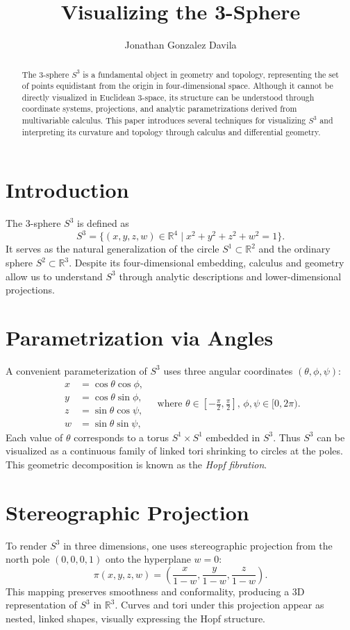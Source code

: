 \documentclass[12pt]{article}
\title{\textbf{Visualizing the 3-Sphere}}
\author{Jonathan Gonzalez Davila}
\date{} %
\begin{document}
\maketitle

\begin{abstract}
The 3-sphere \( S^3 \) is a fundamental object in geometry and topology, representing the set of points equidistant from the origin in four-dimensional space. Although it cannot be directly visualized in Euclidean 3-space, its structure can be understood through coordinate systems, projections, and analytic parametrizations derived from multivariable calculus. This paper introduces several techniques for visualizing \( S^3 \) and interpreting its curvature and topology through calculus and differential geometry.
\end{abstract}

\section{Introduction}
The 3-sphere \( S^3 \) is defined as
\[
S^3 = \{ (x, y, z, w) \in \mathbb{R}^4 \mid x^2 + y^2 + z^2 + w^2 = 1 \}.
\]
It serves as the natural generalization of the circle \( S^1 \subset \mathbb{R}^2 \) and the ordinary sphere \( S^2 \subset \mathbb{R}^3 \). Despite its four-dimensional embedding, calculus and geometry allow us to understand \( S^3 \) through analytic descriptions and lower-dimensional projections.

\section{Parametrization via Angles}
A convenient parameterization of \( S^3 \) uses three angular coordinates \((\theta, \phi, \psi)\):
\[
\begin{aligned}
x &= \cos \theta \cos \phi, \\
y &= \cos \theta \sin \phi, \\
z &= \sin \theta \cos \psi, \\
w &= \sin \theta \sin \psi,
\end{aligned}
\quad
\text{where } \theta \in \left[-\tfrac{\pi}{2}, \tfrac{\pi}{2}\right],\,
\phi, \psi \in [0, 2\pi).
\]
Each value of \( \theta \) corresponds to a torus \( S^1 \times S^1 \) embedded in \( S^3 \). Thus \( S^3 \) can be visualized as a continuous family of linked tori shrinking to circles at the poles. This geometric decomposition is known as the \emph{Hopf fibration}.

\section{Stereographic Projection}
To render \( S^3 \) in three dimensions, one uses stereographic projection from the north pole \( (0,0,0,1) \) onto the hyperplane \( w=0 \):
\[
\pi(x, y, z, w) = \left(\frac{x}{1-w}, \frac{y}{1-w}, \frac{z}{1-w}\right).
\]
This mapping preserves smoothness and conformality, producing a 3D representation of \( S^3 \) in \( \mathbb{R}^3 \). Curves and tori under this projection appear as nested, linked shapes, visually expressing the Hopf structure.
\end{document}
